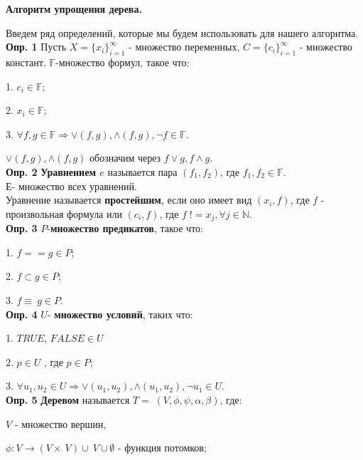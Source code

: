 \documentclass[12pt]{article}
\begin{document}
 
	\begin{center}
	{\bf\large Алгоритм упрощения дерева.}
	\end{center}
	Введем ряд определений, которые мы будем использовать для нашего алгоритма.
	\\
	
	{\bf Опр. 1} Пусть $X = \lbrace  x_{i}  \rbrace_{i=1}^{\infty} $ - множество переменных,
	$C = \lbrace  c_{i}  \rbrace_{i=1}^{\infty} $ - множество констант. $\mathbb{F}$-множество формул, такое что:
	
	1. $c_{i} \in \mathbb{F} $; 
	
	2. $x_{i} \in \mathbb{F} $; 
	
	3. $\forall f, g \in \mathbb{F} \Rightarrow \vee(f,g), \wedge(f,g), \neg f \in \mathbb{F}$.
	
	 $\vee(f,g), \wedge(f,g)$ обозначим через $f \vee g, f \wedge g$.
	\\

	{\bf Опр. 2} {\bf Уравнением  $e$} называется пара $(f_{1},f_{2})$, где $f_{1},f_{2} \in \mathbb{F}$.\\Е- множество всех уравнений.
	\\Уравнение называется {\bf простейшим}, если оно имеет вид $(x_{i}, f)$, где $f$ - произвольная формула или $(c_{i}, f)$, где $f \; != x_{j}, \forall j \in \mathbb{N}$.
	\\
	
	{\bf Опр. 3} $P$-{\bf множество предикатов}, такое что: 
	
	1. $f==g \in P$; 
	
    2. $f \subset g \in P$;
    
    3. $f \equiv \: g \in P$.
    \\
    
    {\bf Опр. 4}  $U$- {\bf множество условий}, таких что: 
    
    1. $TRUE$, $FALSE \in U$
    
    2. $p \in U$ , где $p \in P$;
    
    3. $\forall u_{1}, u_{2} \in U \Rightarrow \vee(u_{1},u_{2}), \wedge(u_{1},u_{2}), \neg u_{1} \in U$.
    \\
    
     \hypertarget{d5}{{\bf Опр. 5}} {\bf Деревом} называется $T = \; (V,\phi,\psi, \alpha, \beta)$, где: 
     
     $V$ - множество вершин,
     
      $\phi : V \rightarrow (V\times \:V)\cup \:V \cup \emptyset$ - функция потомков;
      
\end{document}
